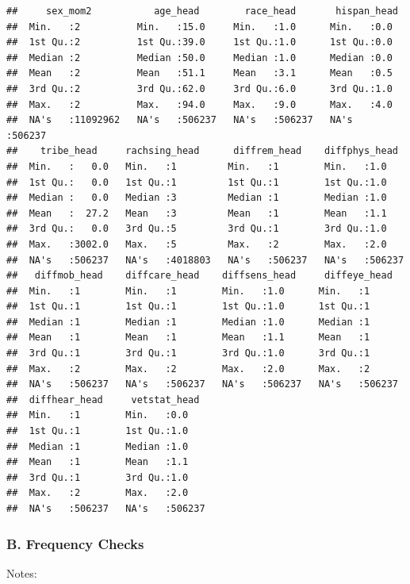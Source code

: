 \documentclass[
]{article}
\begin{document}
\begin{verbatim}
##     sex_mom2           age_head        race_head       hispan_head    
##  Min.   :2          Min.   :15.0     Min.   :1.0      Min.   :0.0     
##  1st Qu.:2          1st Qu.:39.0     1st Qu.:1.0      1st Qu.:0.0     
##  Median :2          Median :50.0     Median :1.0      Median :0.0     
##  Mean   :2          Mean   :51.1     Mean   :3.1      Mean   :0.5     
##  3rd Qu.:2          3rd Qu.:62.0     3rd Qu.:6.0      3rd Qu.:1.0     
##  Max.   :2          Max.   :94.0     Max.   :9.0      Max.   :4.0     
##  NA's   :11092962   NA's   :506237   NA's   :506237   NA's   :506237  
##    tribe_head     rachsing_head      diffrem_head    diffphys_head   
##  Min.   :   0.0   Min.   :1         Min.   :1        Min.   :1.0     
##  1st Qu.:   0.0   1st Qu.:1         1st Qu.:1        1st Qu.:1.0     
##  Median :   0.0   Median :3         Median :1        Median :1.0     
##  Mean   :  27.2   Mean   :3         Mean   :1        Mean   :1.1     
##  3rd Qu.:   0.0   3rd Qu.:5         3rd Qu.:1        3rd Qu.:1.0     
##  Max.   :3002.0   Max.   :5         Max.   :2        Max.   :2.0     
##  NA's   :506237   NA's   :4018803   NA's   :506237   NA's   :506237  
##   diffmob_head    diffcare_head    diffsens_head     diffeye_head   
##  Min.   :1        Min.   :1        Min.   :1.0      Min.   :1       
##  1st Qu.:1        1st Qu.:1        1st Qu.:1.0      1st Qu.:1       
##  Median :1        Median :1        Median :1.0      Median :1       
##  Mean   :1        Mean   :1        Mean   :1.1      Mean   :1       
##  3rd Qu.:1        3rd Qu.:1        3rd Qu.:1.0      3rd Qu.:1       
##  Max.   :2        Max.   :2        Max.   :2.0      Max.   :2       
##  NA's   :506237   NA's   :506237   NA's   :506237   NA's   :506237  
##  diffhear_head     vetstat_head   
##  Min.   :1        Min.   :0.0     
##  1st Qu.:1        1st Qu.:1.0     
##  Median :1        Median :1.0     
##  Mean   :1        Mean   :1.1     
##  3rd Qu.:1        3rd Qu.:1.0     
##  Max.   :2        Max.   :2.0     
##  NA's   :506237   NA's   :506237
\end{verbatim}

\subsubsection{B. Frequency Checks}\label{b.-frequency-checks}

Notes:
\end{document}
